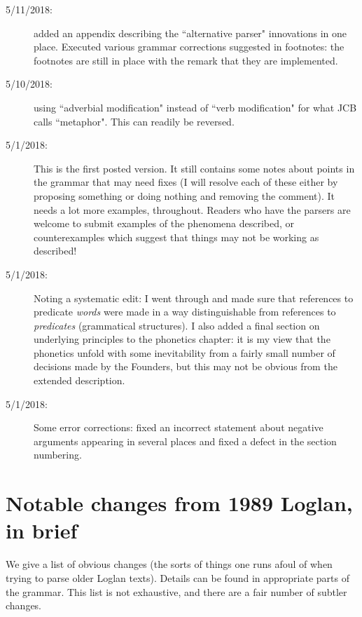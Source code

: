 \documentclass[12pt]{book}
\begin{document}
\begin{description}
\item[5/11/2018:]  added an appendix describing the ``alternative parser" innovations in one place.  Executed various grammar corrections suggested in footnotes:  the footnotes are still in place with the remark that they are implemented.

\item[5/10/2018:]  using ``adverbial modification" instead of ``verb modification" for what JCB calls ``metaphor".  This can readily be reversed.

\item[5/1/2018:]  This is the first posted version.  It still contains some notes about points in the grammar that may need fixes (I will resolve each of these either by proposing something or doing nothing and removing the comment).  It needs a lot more examples, throughout.  Readers who have the parsers
are welcome to submit examples of the phenomena described, or counterexamples which suggest that things may not be working as described!

\item[5/1/2018:]  Noting a systematic edit:  I went through and made sure that references to predicate {\em words} were made in a way distinguishable from references to {\em predicates} (grammatical structures).  I also added a final section on underlying principles to the phonetics chapter:  it is my view that the phonetics unfold with some inevitability from a fairly small number of decisions made by the Founders, but this may not be obvious from the extended description.

\item[5/1/2018:]  Some error corrections:  fixed an incorrect statement about negative arguments appearing in several places and fixed a defect in the section numbering.











\end{description}

\newpage

\section{Notable changes from 1989 Loglan, in brief}

We give a list of obvious changes (the sorts of things one runs afoul of when trying to parse older Loglan texts).  Details can be found in appropriate parts of the grammar.   This list is not exhaustive, and there are a fair number of subtler changes.
\end{document}
